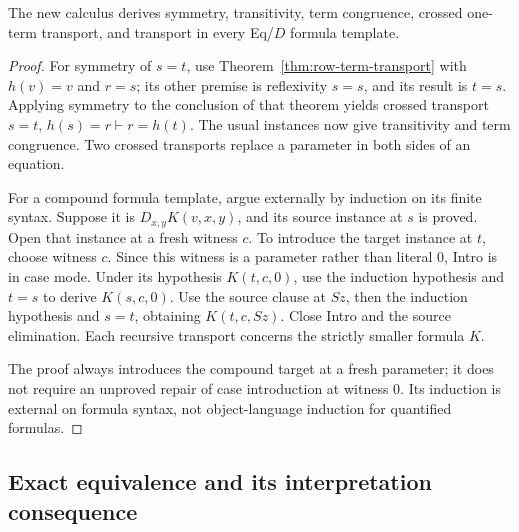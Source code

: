 \begin{corollary}
\label{cor:row-formula-transport}
The new calculus derives symmetry, transitivity, term congruence,
crossed one-term transport, and transport in every Eq/$D$ formula template.
\end{corollary}
\begin{proof}
For symmetry of $s=t$, use
Theorem~\ref{thm:row-term-transport} with $h(v)=v$ and $r=s$; its other
premise is reflexivity $s=s$, and its result is $t=s$.  Applying symmetry
to the conclusion of that theorem yields crossed transport
$s=t,\,h(s)=r\vdash r=h(t)$.  The usual instances now give transitivity
and term congruence.  Two crossed transports replace a parameter in
both sides of an equation.

For a compound formula template, argue externally by induction on its
finite syntax.  Suppose it is $D_{x,y}K(v,x,y)$, and its source instance
at $s$ is proved.  Open that instance at a fresh witness $c$.  To introduce
the target instance at $t$, choose witness $c$.  Since this witness is a
parameter rather than literal $0$, Intro is in case mode.  Under its
hypothesis $K(t,c,0)$, use the induction hypothesis and $t=s$ to derive
$K(s,c,0)$.  Use the source clause at $Sz$, then the induction hypothesis
and $s=t$, obtaining $K(t,c,Sz)$.  Close Intro and the source elimination.
Each recursive transport concerns the strictly smaller formula $K$.

The proof always introduces the compound target at a fresh parameter;
it does not require an unproved repair of case introduction at witness
$0$.  Its induction is external on formula syntax, not object-language
induction for quantified formulas.
\end{proof}

\subsection{Exact equivalence and its interpretation consequence}

